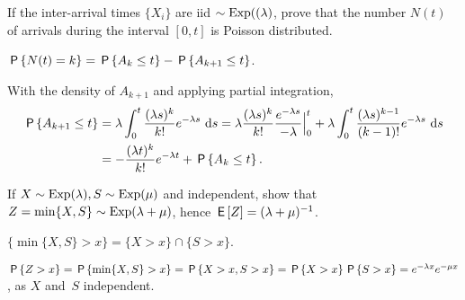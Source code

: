 \documentclass[stochastic-or.tex]{subfiles}
\begin{document}
\begin{exercise}\label{ex:l-213}
If the inter-arrival times $\{X_i\}$ are iid
 $\sim \Exp{(\lambda}$, prove that the number $N(t)$ of arrivals during the interval $[0,t]$ is Poisson distributed.
\begin{hint}
 $\P{N(t)=k} = \P{A_k \leq t} - \P{A_{k+1} \leq t}$.
\end{hint}
\begin{solution}
With  the density of $A_{k+1}$ and applying partial integration,
\begin{align*}
\P{A_{k+1} \leq t}
&= \lambda \int_0^t \frac{(\lambda s)^{k}}{k!}e^{-\lambda s}\, \d s
= \lambda \frac{(\lambda s)^{k}}{k!}\frac{e^{-\lambda s}}{-\lambda} \Big|_{0}^t + \lambda \int_0^t \frac{(\lambda s)^{k-1}}{(k-1)!}e^{-\lambda s}\, \d s \\
&= - \frac{(\lambda t)^{k}}{k!} e^{-\lambda t} + \P{A_k \leq t}.
\end{align*}
\end{solution}
\end{exercise}



\begin{exercise}\label{ex:10}
 If  $X\sim\Exp{\lambda}, S\sim\Exp{\mu}$ and
 independent, show that $Z=\min\{X,S\}\sim\Exp{\lambda+\mu}$,
hence $\E Z = (\lambda+\mu)^{-1}$.
\begin{hint}
$\{\min\{X, S\}>x\} =\{X>x\} \cap\{S> x\}$.
\end{hint}
\begin{solution}
$\P{Z>x} = \P{\min\{X,S\}>x} = \P{X>x, S> x} = \P{X>x}\P{S>x}  = e^{-\lambda x} e^{-\mu x}$, as  $X$ and~$S$ independent.
\end{solution}
\end{exercise}
\end{document}
